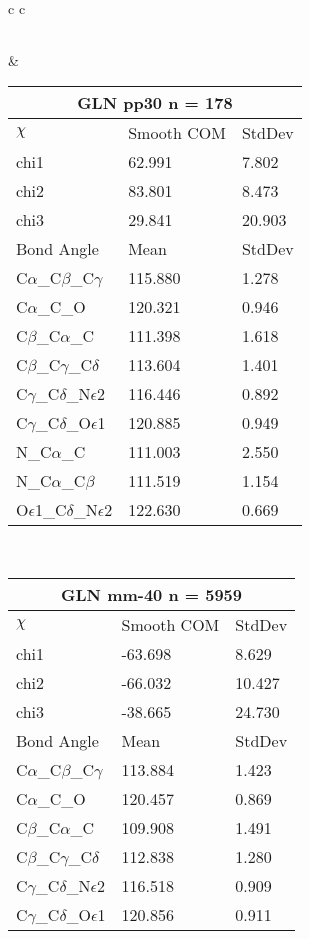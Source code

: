 \begin{longtable}{ c c }
\begin{tabular}{ l l l }
  \bottomrule
  \end{tabular}
  &
  \begin{tabular}{ l l l }
  \toprule
  \multicolumn{3}{c}{GLN \textbf{pp30} n = 178} \\ \toprule
  $\chi$       & Smooth COM & StdDev \\ \midrule
  chi1 & 62.991 & 7.802 \\ 
  chi2 & 83.801 & 8.473 \\ 
  chi3 & 29.841 & 20.903 \\ \midrule
  Bond Angle   & Mean     & StdDev \\ \midrule
  C$\alpha$\_C$\beta$\_C$\gamma$ & 115.880 & 1.278\\
  C$\alpha$\_C\_O & 120.321 & 0.946\\
  C$\beta$\_C$\alpha$\_C & 111.398 & 1.618\\
  C$\beta$\_C$\gamma$\_C$\delta$ & 113.604 & 1.401\\
  C$\gamma$\_C$\delta$\_N$\epsilon$2 & 116.446 & 0.892\\
  C$\gamma$\_C$\delta$\_O$\epsilon$1 & 120.885 & 0.949\\
  N\_C$\alpha$\_C & 111.003 & 2.550\\
  N\_C$\alpha$\_C$\beta$ & 111.519 & 1.154\\
  O$\epsilon$1\_C$\delta$\_N$\epsilon$2 & 122.630 & 0.669\\
  \bottomrule
  \end{tabular}
  \\
  \begin{tabular}{ l l l }
  \toprule
  \multicolumn{3}{c}{GLN \textbf{mm-40} n = 5959} \\ \toprule
  $\chi$       & Smooth COM & StdDev \\ \midrule
  chi1 & -63.698 & 8.629 \\ 
  chi2 & -66.032 & 10.427 \\ 
  chi3 & -38.665 & 24.730 \\ \midrule
  Bond Angle   & Mean     & StdDev \\ \midrule
  C$\alpha$\_C$\beta$\_C$\gamma$ & 113.884 & 1.423\\
  C$\alpha$\_C\_O & 120.457 & 0.869\\
  C$\beta$\_C$\alpha$\_C & 109.908 & 1.491\\
  C$\beta$\_C$\gamma$\_C$\delta$ & 112.838 & 1.280\\
  C$\gamma$\_C$\delta$\_N$\epsilon$2 & 116.518 & 0.909\\
  C$\gamma$\_C$\delta$\_O$\epsilon$1 & 120.856 & 0.911\\

\end{tabular}
\end{longtable}
